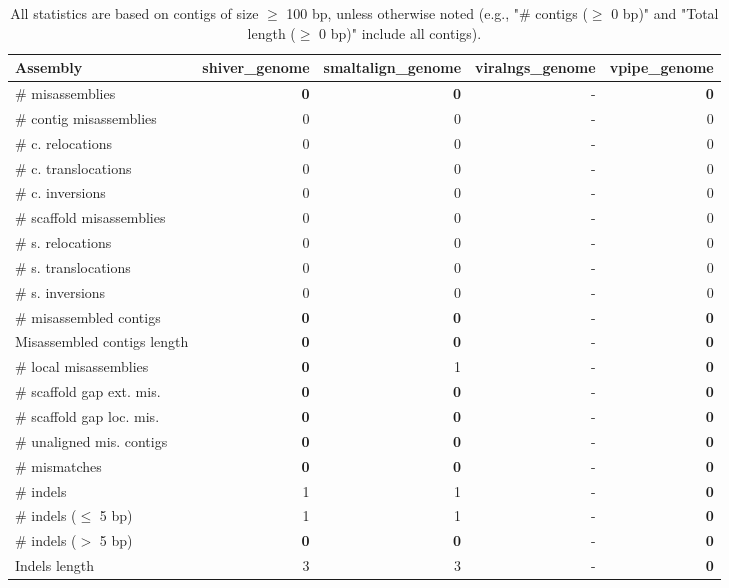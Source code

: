 \documentclass[12pt,a4paper]{article}
\begin{document}
\begin{table}[ht]
\begin{center}
\caption{All statistics are based on contigs of size $\geq$ 100 bp, unless otherwise noted (e.g., "\# contigs ($\geq$ 0 bp)" and "Total length ($\geq$ 0 bp)" include all contigs).}
\begin{tabular}{|l*{4}{|r}|}
\hline
Assembly & shiver\_genome & smaltalign\_genome & viralngs\_genome & vpipe\_genome \\ \hline
\# misassemblies & {\bf 0} & {\bf 0} & - & {\bf 0} \\ \hline
\hspace{2mm}\# contig misassemblies & 0 & 0 & - & 0 \\ \hline
\hspace{5mm}\# c. relocations & 0 & 0 & - & 0 \\ \hline
\hspace{5mm}\# c. translocations & 0 & 0 & - & 0 \\ \hline
\hspace{5mm}\# c. inversions & 0 & 0 & - & 0 \\ \hline
\hspace{2mm}\# scaffold misassemblies & 0 & 0 & - & 0 \\ \hline
\hspace{5mm}\# s. relocations & 0 & 0 & - & 0 \\ \hline
\hspace{5mm}\# s. translocations & 0 & 0 & - & 0 \\ \hline
\hspace{5mm}\# s. inversions & 0 & 0 & - & 0 \\ \hline
\# misassembled contigs & {\bf 0} & {\bf 0} & - & {\bf 0} \\ \hline
Misassembled contigs length & {\bf 0} & {\bf 0} & - & {\bf 0} \\ \hline
\# local misassemblies & {\bf 0} & 1 & - & {\bf 0} \\ \hline
\# scaffold gap ext. mis. & {\bf 0} & {\bf 0} & - & {\bf 0} \\ \hline
\# scaffold gap loc. mis. & {\bf 0} & {\bf 0} & - & {\bf 0} \\ \hline
\# unaligned mis. contigs & {\bf 0} & {\bf 0} & - & {\bf 0} \\ \hline
\# mismatches & {\bf 0} & {\bf 0} & - & {\bf 0} \\ \hline
\# indels & 1 & 1 & - & {\bf 0} \\ \hline
\hspace{5mm}\# indels ($\leq$ 5 bp) & 1 & 1 & - & {\bf 0} \\ \hline
\hspace{5mm}\# indels ($>$ 5 bp) & {\bf 0} & {\bf 0} & - & {\bf 0} \\ \hline
Indels length & 3 & 3 & - & {\bf 0} \\ \hline
\end{tabular}
\end{center}
\end{table}
\end{document}
